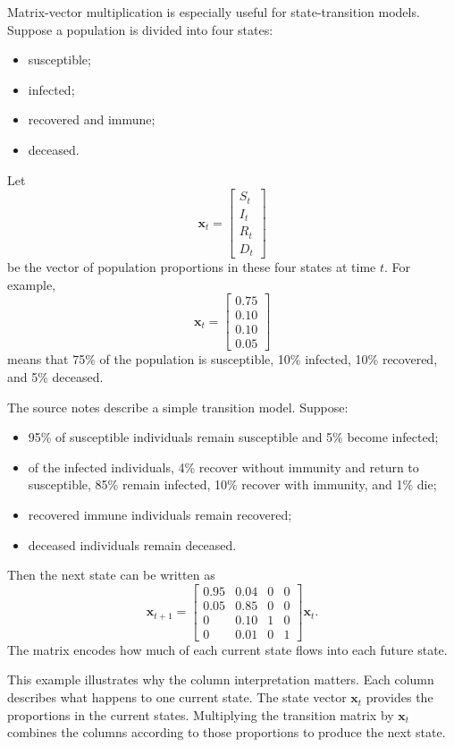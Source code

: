 Matrix-vector multiplication is especially useful for state-transition models. Suppose a population is divided into four states:
\begin{itemize}
    \item susceptible;
    \item infected;
    \item recovered and immune;
    \item deceased.
\end{itemize}
Let
\[
    \mathbf{x}_t=
    \begin{bmatrix}
        S_t\\ I_t\\ R_t\\ D_t
    \end{bmatrix}
\]
be the vector of population proportions in these four states at time \(t\). For example,
\[
    \mathbf{x}_t=\begin{bmatrix}0.75\\0.10\\0.10\\0.05\end{bmatrix}
\]
means that 75\% of the population is susceptible, 10\% infected, 10\% recovered, and 5\% deceased.

The source notes describe a simple transition model. Suppose:
\begin{itemize}
    \item 95\% of susceptible individuals remain susceptible and 5\% become infected;
    \item of the infected individuals, 4\% recover without immunity and return to susceptible, 85\% remain infected, 10\% recover with immunity, and 1\% die;
    \item recovered immune individuals remain recovered;
    \item deceased individuals remain deceased.
\end{itemize}
Then the next state can be written as
\[
    \mathbf{x}_{t+1}
    =
    \begin{bmatrix}
        0.95 & 0.04 & 0 & 0\\
        0.05 & 0.85 & 0 & 0\\
        0 & 0.10 & 1 & 0\\
        0 & 0.01 & 0 & 1
    \end{bmatrix}
    \mathbf{x}_t.
\]
The matrix encodes how much of each current state flows into each future state.

This example illustrates why the column interpretation matters. Each column describes what happens to one current state. The state vector \(\mathbf{x}_t\) provides the proportions in the current states. Multiplying the transition matrix by \(\mathbf{x}_t\) combines the columns according to those proportions to produce the next state.

